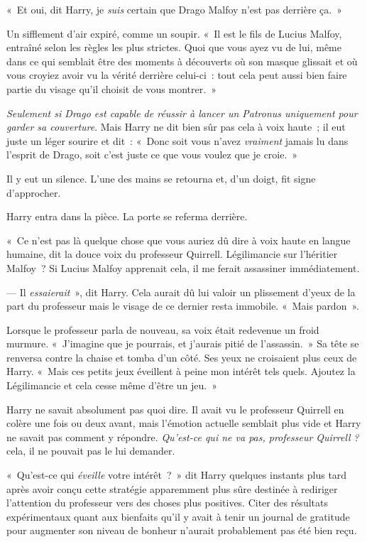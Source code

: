 «~Et oui, dit Harry, je \emph{suis} certain que Drago Malfoy n'est pas derrière ça.~»

Un sifflement d'air expiré, comme un soupir.
«~Il est le fils de Lucius Malfoy, entraîné selon les règles les plus strictes.
Quoi que vous ayez vu de lui, même dans ce qui semblait être des moments à découverts où son masque glissait et où vous croyiez avoir vu la vérité derrière celui-ci~: tout cela peut aussi bien faire partie du visage qu'il choisit de vous montrer.~»

\emph{Seulement si Drago est capable de réussir à lancer un Patronus uniquement pour garder sa couverture}.
Mais Harry ne dit bien sûr pas cela à voix haute~; il eut juste un léger sourire et dit~: «~Donc soit vous n'avez \emph{vraiment} jamais lu dans l'esprit de Drago, soit c'est juste ce que vous voulez que je croie.~»

Il y eut un silence.
L'une des mains se retourna et, d'un doigt, fit signe d'approcher.

Harry entra dans la pièce.
La porte se referma derrière.

«~Ce n'est pas là quelque chose que vous auriez dû dire à voix haute en langue humaine, dit la douce voix du professeur Quirrell.
Légilimancie sur l'héritier Malfoy~?
Si Lucius Malfoy apprenait cela, il me ferait assassiner immédiatement.

--- Il \emph{essaierait}~», dit Harry.
Cela aurait dû lui valoir un plissement d'yeux de la part du professeur mais le visage de ce dernier resta immobile.
«~Mais pardon~».

Lorsque le professeur parla de nouveau, sa voix était redevenue un froid murmure.
«~J'imagine que je pourrais, et j'aurais pitié de l'assassin.~»
Sa tête se renversa contre la chaise et tomba d'un côté.
Ses yeux ne croisaient plus ceux de Harry.
«~Mais ces petits jeux éveillent à peine mon intérêt tels quels.
Ajoutez la Légilimancie et cela cesse même d'être un jeu.~»

Harry ne savait absolument pas quoi dire.
Il avait vu le professeur Quirrell en colère une fois ou deux avant, mais l'émotion actuelle semblait plus vide et Harry ne savait pas comment y répondre.
\emph{Qu'est-ce qui ne va pas, professeur Quirrell} \emph{?} cela, il ne pouvait pas le lui demander.

«~Qu'est-ce qui \emph{éveille} votre intérêt~?~»
dit Harry quelques instants plus tard après avoir conçu cette stratégie apparemment plus sûre destinée à rediriger l'attention du professeur vers des choses plus positives.
Citer des résultats expérimentaux quant aux bienfaits qu'il y avait à tenir un journal de gratitude pour augmenter son niveau de bonheur n'aurait probablement pas été bien reçu.

